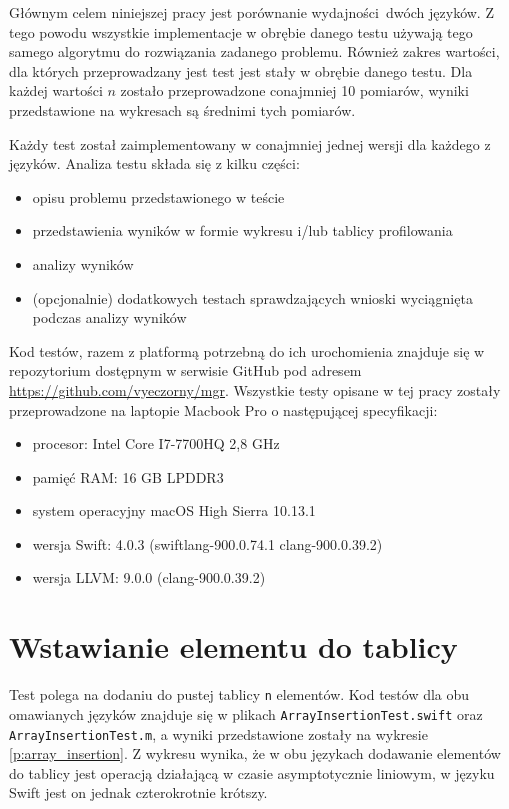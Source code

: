 \documentclass[mgr, shortabstract]{iithesis}
\newcommand{\swiftinline}[1]{
    \texttt{#1}
}
\begin{document}
Głównym celem niniejszej pracy jest porównanie wydajności dwóch języków. Z tego powodu wszystkie implementacje w obrębie danego testu używają tego samego algorytmu do rozwiązania zadanego problemu. Również zakres wartości, dla których przeprowadzany jest test jest stały w obrębie danego testu. Dla każdej wartości $n$ zostało przeprowadzone conajmniej 10 pomiarów, wyniki przedstawione na wykresach są średnimi tych pomiarów.

Każdy test został zaimplementowany w conajmniej jednej wersji dla każdego z języków. Analiza testu składa się z kilku części:

\begin{itemize}
    \item opisu problemu przedstawionego w teście
    \item przedstawienia wyników w formie wykresu i/lub tablicy profilowania
    \item analizy wyników
    \item (opcjonalnie) dodatkowych testach sprawdzających wnioski wyciągnięta podczas analizy wyników
\end{itemize}

Kod testów, razem z platformą potrzebną do ich urochomienia znajduje się w repozytorium dostępnym w serwisie GitHub pod adresem \url{https://github.com/vyeczorny/mgr}. Wszystkie testy opisane w tej pracy zostały przeprowadzone na laptopie Macbook Pro o następującej specyfikacji:

\begin{itemize}
    \item procesor: Intel Core I7-7700HQ 2,8 GHz
    \item pamięć RAM: 16 GB LPDDR3
    \item system operacyjny macOS High Sierra 10.13.1
    \item wersja Swift: 4.0.3 (swiftlang-900.0.74.1 clang-900.0.39.2)
    \item wersja LLVM: 9.0.0 (clang-900.0.39.2)
\end{itemize}

\section{Wstawianie elementu do tablicy}

Test polega na dodaniu do pustej tablicy \swiftinline{n} elementów. Kod testów dla obu omawianych języków znajduje się w plikach \texttt{ArrayInsertionTest.swift} oraz \texttt{ArrayInsertionTest.m}, a wyniki przedstawione zostały na wykresie \ref{p:array_insertion}. Z wykresu wynika, że w obu językach dodawanie elementów do tablicy jest operacją działającą w czasie asymptotycznie liniowym, w języku Swift jest on jednak czterokrotnie krótszy.
\end{document}
